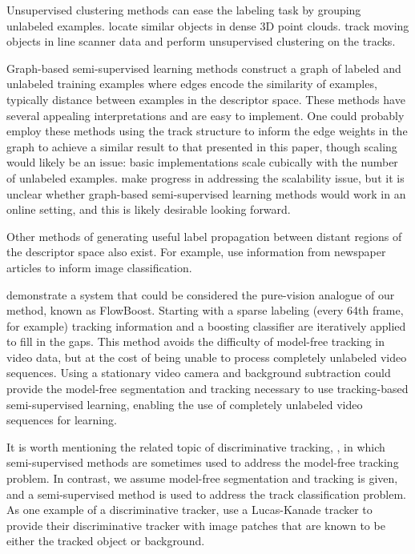 \documentclass[conference]{IEEEtran}
\begin{document}
Unsupervised clustering methods can ease the labeling task by grouping unlabeled examples.  \citet{Triebel2010} locate similar objects in dense 3D point clouds.  \citet{Luber2008} track moving objects in line scanner data and perform unsupervised clustering on the tracks.

Graph-based semi-supervised learning methods \citep{Zhu2003} construct a graph of labeled and unlabeled training examples where edges encode the similarity of examples, typically distance between examples in the descriptor space.  These methods have several appealing interpretations and are easy to implement.  One could probably employ these methods using the track structure to inform the edge weights in the graph to achieve a similar result to that presented in this paper, though scaling would likely be an issue: basic implementations scale cubically with the number of unlabeled examples.  \citet{Liu2010} make progress in addressing the scalability issue, but it is unclear whether graph-based semi-supervised learning methods would work in an online setting, and this is likely desirable looking forward.

Other methods of generating useful label propagation between distant regions of the descriptor space also exist.  For example, \citet{Socher2010} use information from newspaper articles to inform image classification.

\citet{Ali2011} demonstrate a system that could be considered the pure-vision analogue of our method, known as FlowBoost.  Starting with a sparse labeling (every 64th frame, for example) tracking information and a boosting classifier are iteratively applied to fill in the gaps.  This method avoids the difficulty of model-free tracking in video data, but at the cost of being unable to process completely unlabeled video sequences.  Using a stationary video camera and background subtraction could provide the model-free segmentation and tracking necessary to use tracking-based semi-supervised learning, enabling the use of completely unlabeled video sequences for learning.

It is worth mentioning the related topic of discriminative tracking, \eg \citep{Kalal2010, Stalder2009, Tang2007}, in which semi-supervised methods are sometimes used to address the model-free tracking problem.  In contrast, we assume model-free segmentation and tracking is given, and a semi-supervised method is used to address the track classification problem.  As one example of a discriminative tracker, \citet{Kalal2010} use a Lucas-Kanade tracker to provide their discriminative tracker with image patches that are known to be either the tracked object or background.
\end{document}
